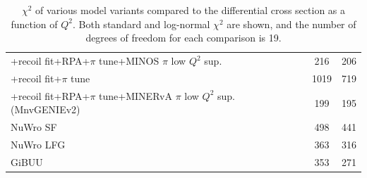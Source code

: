 \documentclass[aps,preprint,showpacs,superscriptaddress,groupedaddress,linenumbers]{revtex4-2}  %
\begin{document}
\begin{table}
\begin{ruledtabular}
\begin{tabular}{lcc}
\qquad+recoil fit+RPA+$\pi$ tune+MINOS $\pi$ low $Q^2$ sup. &	        216 &	        206 \\
\qquad+recoil fit+$\pi$ tune &	       1019 &	        719 \\
\qquad+recoil fit+RPA+$\pi$ tune+MINERvA $\pi$ low $Q^2$ sup. (MnvGENIEv2) &	        199 &	        195 \\
\hline
NuWro SF &	        498 &	        441 \\
NuWro LFG &	        363 &	        316 \\
\hline
GiBUU &	        353 &	        271 \\

\end{tabular}
\end{ruledtabular}
\caption{\label{1DChi2} $\chi^2$ of various model variants compared to the differential cross section as a function of $Q^2$. Both standard and log-normal $\chi^2$ are shown, and the number of degrees of freedom for each comparison is 19.}
\end{table} 
\end{document}
